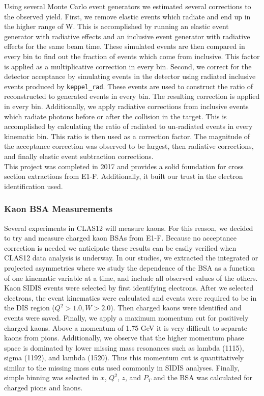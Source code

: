 Using several Monte Carlo event generators we estimated several corrections to the observed yield.  First, we remove elastic events which radiate and end up in the higher range of W.  This is accomplished by running an elastic event generator with radiative effects and an inclusive event generator with radiative effects for the same beam time.  These simulated events are then compared in every bin to find out the fraction of events which come from inclusive.  This factor is applied as a multiplicative correction in every bin.  Second, we correct for the detector acceptance by simulating events in the detector using radiated inclusive events produced by \texttt{keppel\_rad}.  These events are used to construct the ratio of reconstructed to generated events in every bin.  The resulting correction is applied in every bin.  Additionally, we apply radiative corrections from inclusive events which radiate photons before or after the collision in the target.  This is accomplished by calculating the ratio of radiated to un-radiated events in every kinematic bin.  This ratio is then used as a correction factor.  The magnitude of the acceptance correction was observed to be largest, then radiative corrections, and finally elastic event subtraction corrections.  \\
This project was completed in 2017 and provides a solid foundation for cross section extractions from E1-F.  Additionally, it built our trust in the electron identification used.

\subsubsection{Kaon BSA Measurements}
Several experiments in CLAS12 will measure kaons.  For this reason, we decided to try and measure charged kaon BSAs from E1-F.  Because no acceptance correction is needed we anticipate these results can be easily verified when CLAS12 data analysis is underway.  In our studies, we extracted the integrated or projected asymmetries where we study the dependence of the BSA as a function of one kinematic variable at a time, and include all observed values of the others.  \\
Kaon SIDIS events were selected by first identifying electrons.  After we selected electrons, the event kinematics were calculated and events were required to be in the DIS region ($Q^2 > 1.0, W > 2.0$).  Then charged kaons were identified and events were saved.  Finally, we apply a maximum momentum cut for positively charged kaons.  Above a momentum of 1.75 GeV it is very difficult to separate kaons from pions.  Additionally, we observe that the higher momentum phase space is dominated by lower missing mass resonances such as lambda (1115), sigma (1192), and lambda (1520).  Thus this momentum cut is quantitatively similar to the missing mass cuts used commonly in SIDIS analyses.  Finally, simple binning was selected in $x$, $Q^2$, $z$, and $P_{T}$ and the BSA was calculated for charged pions and kaons.    

